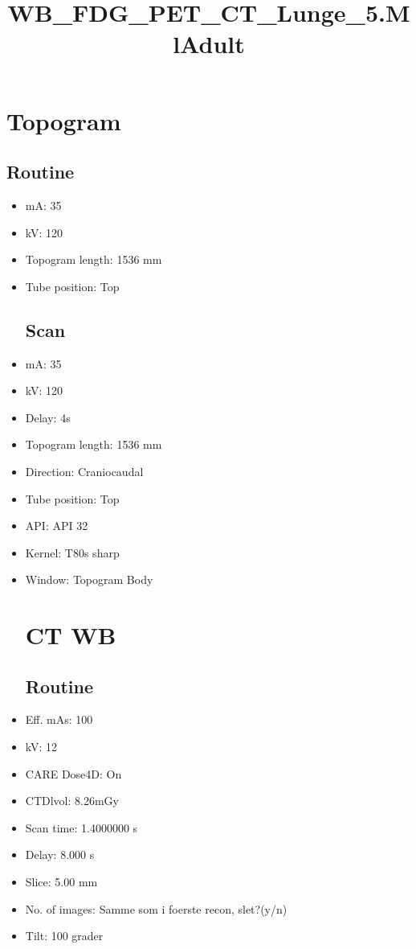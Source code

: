 \documentclass[12pt]{article}
\title{WB\_FDG\_PET\_CT\_Lunge\_5.MlAdult}
\begin{document}
\maketitle
\newpage
\tableofcontents
\newpage
{}


\section{Topogram}
\subsection{Routine}
 \begin{itemize}\item mA: 35\item kV: 120\item Topogram length: 1536 mm\item Tube position: Top
\subsection{Scan}
\item mA: 35\item kV: 120\item Delay: 4s\item Topogram length: 1536 mm\item Direction: Craniocaudal\item Tube position: Top\item API: API 32\item Kernel: T80s sharp\item Window: Topogram Body
\section{CT WB}
\subsection{Routine}
\item Eff. mAs: 100\item kV: 12\item CARE Dose4D: On\item CTDlvol: 8.26mGy\item Scan time: 1.4000000 s\item Delay: 8.000 s\item Slice: 5.00 mm\item No. of images: Samme som i foerste recon, slet?(y/n)\item Tilt: 100 grader

\end{itemize}
\end{document}
